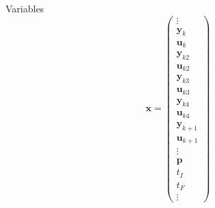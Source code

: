 \documentclass[]{article}
\begin{document}
\noindent Variables 
\begin{equation}
    \mathbf{x} = \begin{pmatrix}
        \vdots \\ \mathbf{y}_k \\ \mathbf{u}_k \\ \mathbf{y}_{k2} \\ \mathbf{u}_{k2} \\ \mathbf{y}_{k3} \\ \mathbf{u}_{k3} \\ \mathbf{y}_{k4} \\ \mathbf{u}_{k4} \\ \mathbf{y}_{k+1} \\ \mathbf{u}_{k+1} \\ \vdots \\ \mathbf{p} \\ t_I \\ t_F \\ \vdots
    \end{pmatrix}
\end{equation}
\end{document}
